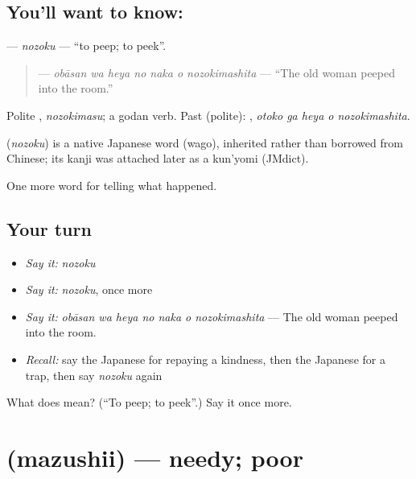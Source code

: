 \subsection*{You'll want to know: }
\textbf{} — \emph{nozoku} — \textquotedblleft{}to peep; to peek\textquotedblright{}.

\begin{quote}
\textbf{   } — \emph{obāsan wa heya no naka o nozokimashita} — \textquotedblleft{}The old woman peeped into the room.\textquotedblright{}
\end{quote}

Polite \textbf{}, \emph{nozokimasu}; a godan verb. Past (polite): \textbf{  }, \emph{otoko ga heya o nozokimashita}.

\begin{cousinweb}
\textbf{} (\emph{nozoku}) is a native Japanese word (wago), inherited rather than borrowed from Chinese; its kanji was attached later as a kun'yomi (JMdict).
\end{cousinweb}

\begin{grammarlens}[title={What you've built}]
One more word for telling what happened.
\end{grammarlens}

\subsection*{Your turn}
\begin{itemize}
\raggedright
  \item \emph{Say it:} \emph{nozoku}
  \item \emph{Say it:} \emph{nozoku}, once more
  \item \emph{Say it:} \emph{obāsan wa heya no naka o nozokimashita} — The old woman peeped into the room.
  \item \emph{Recall:} say the Japanese for repaying a kindness, then the Japanese for a trap, then say \emph{nozoku} again
\end{itemize}

\begin{tcolorbox}[breakable,colback=teal!4,colframe=teal!35!black,title={Before you move on}]
What does  mean? (\textquotedblleft{}To peep; to peek\textquotedblright{}.) Say it once more.
\end{tcolorbox}
\section[\texorpdfstring{\ja{まずしい} (mazushii)}{まずしい (mazushii)}]{ (mazushii) — needy; poor}

